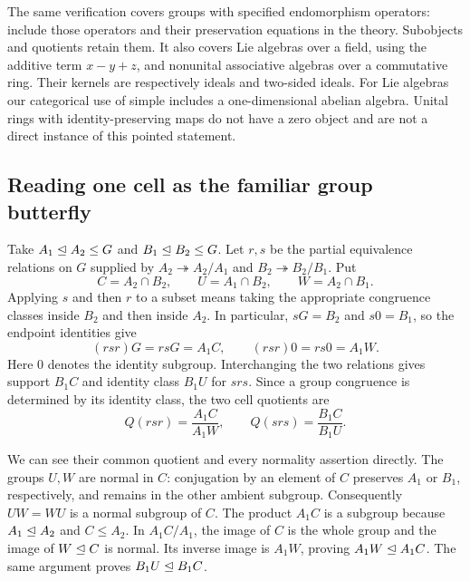 The same verification covers groups with specified endomorphism operators:
include those operators and their preservation equations in the theory.
Subobjects and quotients retain them. It also covers Lie algebras over a field,
using the additive term $x-y+z$, and nonunital associative algebras over a
commutative ring. Their kernels are respectively ideals and two-sided ideals.
For Lie algebras our categorical use of simple includes a one-dimensional
abelian algebra. Unital rings with identity-preserving maps do not have a zero
object and are not a direct instance of this pointed statement.

\subsection{Reading one cell as the familiar group butterfly}
\label{e:butterfly-dictionary}

Take $A_1\trianglelefteq A_2\leq G$ and $B_1\trianglelefteq B_2\leq G$.
Let $r,s$ be the partial equivalence relations on $G$ supplied by
$A_2\twoheadrightarrow A_2/A_1$ and $B_2\twoheadrightarrow B_2/B_1$.
Put
\[
 C=A_2\cap B_2,\qquad U=A_1\cap B_2,\qquad W=A_2\cap B_1.
\]
Applying $s$ and then $r$ to a subset means taking the appropriate
congruence classes inside $B_2$ and then inside $A_2$. In particular,
$sG=B_2$ and $s0=B_1$, so the endpoint identities give
\[
 (rsr)G=rsG=A_1C,\qquad (rsr)0=rs0=A_1W.
\]
Here $0$ denotes the identity subgroup. Interchanging the two relations gives
support $B_1C$ and identity class $B_1U$ for $srs$. Since a group
congruence is determined by its identity class, the two cell quotients are
\[
 Q(rsr)=\frac{A_1C}{A_1W},\qquad
 Q(srs)=\frac{B_1C}{B_1U}.
\]

We can see their common quotient and every normality assertion directly.
The groups $U,W$ are normal in $C$: conjugation by an element of $C$
preserves $A_1$ or $B_1$, respectively, and remains in the other ambient
subgroup. Consequently $UW=WU$ is a normal subgroup of $C$.
The product $A_1C$ is a subgroup because $A_1\trianglelefteq A_2$ and $C\leq A_2$.
In $A_1C/A_1$, the image of $C$ is the whole group and the image of
$W\trianglelefteq C$ is normal. Its inverse image is $A_1W$, proving
$A_1W\trianglelefteq A_1C$. The same argument proves $B_1U\trianglelefteq B_1C$.

